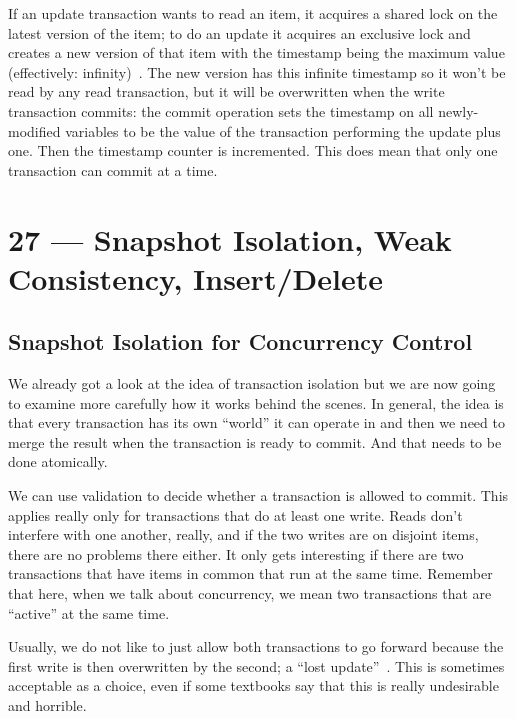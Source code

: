 \documentclass[a4paper]{report}
\begin{document}
If an update transaction wants to read an item, it acquires a shared lock on the latest version of the item; to do an update it acquires an exclusive lock and creates a new version of that item with the timestamp being the maximum value (effectively: infinity)~\cite{dsc}. The new version has this infinite timestamp so it won't be read by any read transaction, but it will be overwritten when the write transaction commits:  the commit operation sets the timestamp on all newly-modified variables to be the value of the transaction performing the update plus one. Then the timestamp counter is incremented. This does mean that only one transaction can commit at a time.









\chapter*{27 --- Snapshot Isolation, Weak Consistency, Insert/Delete}


\section*{Snapshot Isolation for Concurrency Control}

We already got a look at the idea of transaction isolation but we are now going to examine more carefully how it works behind the scenes. In general, the idea is that every transaction has its own ``world'' it can operate in and then we need to merge the result when the transaction is ready to commit. And that needs to be done atomically.

We can use validation to decide whether a transaction is allowed to commit. This applies really only for transactions that do at least one write. Reads don't interfere with one another, really, and if the two writes are on disjoint items, there are no problems there either. It only gets interesting if there are two transactions that have items in common that run at the same time. Remember that here, when we talk about concurrency, we mean two transactions that are ``active'' at the same time.

Usually, we do not like to just allow both transactions to go forward because the first write is then overwritten by the second; a ``lost update''~\cite{dsc}. This is sometimes  acceptable as a choice, even if some textbooks say that this is really undesirable and horrible.
\end{document}
